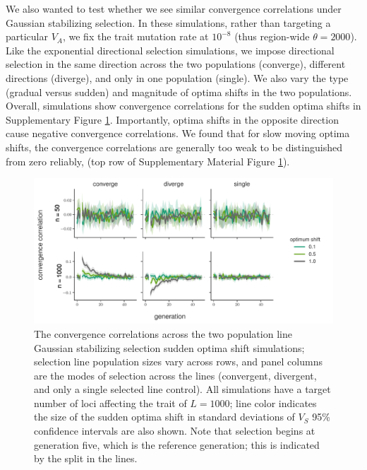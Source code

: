 \documentclass[11pt]{article}
\begin{document}
We also wanted to test whether we see similar convergence correlations under
Gaussian stabilizing selection. In these simulations, rather than targeting a
particular $V_A$, we fix the trait mutation rate at $10^{-8}$ (thus region-wide
$\theta = 2000$). Like the exponential directional selection simulations, we
impose directional selection in the same direction across the two populations
(converge), different directions (diverge), and only in one population
(single). We also vary the type (gradual versus sudden) and magnitude of optima
shifts in the two populations. Overall, simulations show convergence
correlations for the sudden optima shifts in Supplementary Figure
\ref{suppfig:convergence-corrs-gss}. Importantly, optima shifts in the opposite
direction cause negative convergence correlations. We found that for slow
moving optima shifts, the convergence correlations are generally too weak to be
distinguished from zero reliably, (top row of Supplementary Material Figure
\ref{suppfig:convergence-corrs-gss}).

\begin{figure}[!ht]
  \centering
  \includegraphics[width=\textwidth]{figures/fig-convergence-corrs-gss.pdf}

  \caption{The convergence correlations across the two population line Gaussian
    stabilizing selection sudden optima shift simulations; selection line
    population sizes vary across rows, and panel columns are the modes of
    selection across the lines (convergent, divergent, and only a single
    selected line control). All simulations have a target number of loci
    affecting the trait of $L = 1000$; line color indicates the size of the
    sudden optima shift in standard deviations of $V_S$ 95\% confidence
  intervals are also shown. Note that selection begins at generation five,
which is the reference generation; this is indicated by the split in the
lines.}

  \label{suppfig:convergence-corrs-gss}
\end{figure}
\end{document}
